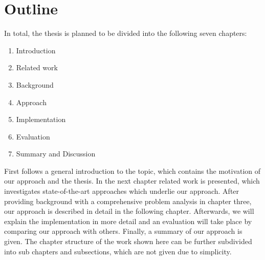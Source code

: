 \chapter{Outline}
\label{ch:outline}

In total, the thesis is planned to be divided into the following seven chapters:
\begin{enumerate}
    \item Introduction
    \item Related work
    \item Background
    \item Approach
    \item Implementation
    \item Evaluation
    \item Summary and Discussion
\end{enumerate}
First follows a general introduction to the topic, which contains the motivation of our approach and the thesis.
In the next chapter related work is presented, which investigates state-of-the-art approaches which underlie our approach.
After providing background with a comprehensive problem analysis in chapter three, our approach is described in detail in the following chapter.
Afterwards, we will explain the implementation in more detail and an evaluation will take place by comparing our approach with others.
Finally, a summary of our approach is given.
The chapter structure of the work shown here can be further subdivided into sub chapters and subsections, which are not given due to simplicity.
